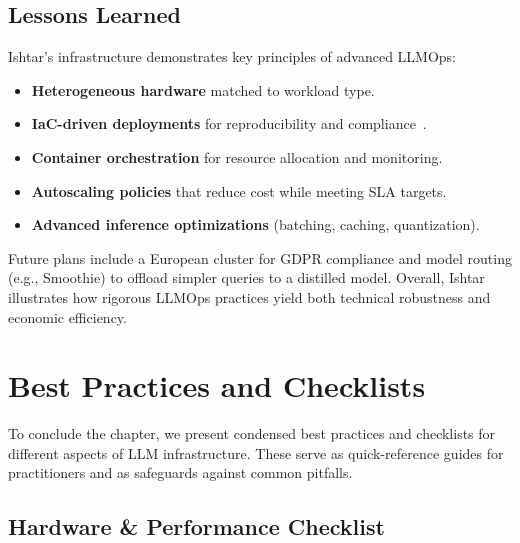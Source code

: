 \subsection{Lessons Learned}
Ishtar’s infrastructure demonstrates key principles of advanced LLMOps:
\begin{itemize}
  \item \textbf{Heterogeneous hardware} matched to workload type.
  \item \textbf{IaC-driven deployments} for reproducibility and compliance~\cite{srivatsa2024-iac-llm,terraform-docs}.
  \item \textbf{Container orchestration} for resource allocation and monitoring.
  \item \textbf{Autoscaling policies} that reduce cost while meeting SLA targets.
  \item \textbf{Advanced inference optimizations} (batching, caching, quantization).
\end{itemize}
Future plans include a European cluster for GDPR compliance and model routing (e.g., Smoothie) to offload simpler queries to a distilled model. Overall, Ishtar illustrates how rigorous LLMOps practices yield both technical robustness and economic efficiency.


\section{Best Practices and Checklists}
\label{sec:bestpractices}

To conclude the chapter, we present condensed best practices and checklists for different aspects of LLM infrastructure. These serve as quick-reference guides for practitioners and as safeguards against common pitfalls.

\subsection{Hardware \& Performance Checklist}
\label{sec:bp-hw}

